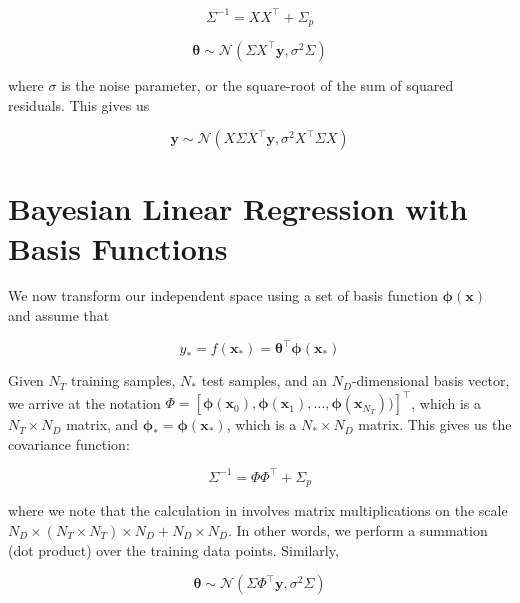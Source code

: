 \documentclass{article}
\begin{document}
\begin{equation}
    \Sigma^{-1} = X X^\top + \Sigma_p
\end{equation} 

\begin{equation}
    \boldsymbol{\theta}\sim\mathcal{N}(\Sigma X^\top \mathbf{y} ,\sigma^2\Sigma)
\end{equation} 

where $\sigma$ is the noise parameter, or the square-root of the sum of squared residuals. This gives us

\begin{equation}
    \mathbf{y}\sim\mathcal{N}(X \Sigma X^\top \mathbf{y} ,\sigma^2X^\top\Sigma X)
\end{equation} 


\section{Bayesian Linear Regression with Basis Functions}

We now transform our independent space using a set of basis function $\boldsymbol{\phi}(\mathbf{x})$ and assume that

\begin{equation}
    y_\ast=f(\mathbf{x_\ast})=\boldsymbol{\theta}^\top\boldsymbol{\phi}(\mathbf{x_\ast})
\end{equation} 

Given $N_T$ training samples, $N_\ast$ test samples, and an $N_D$-dimensional basis vector, we arrive at the notation $\Phi=[\boldsymbol{\phi}(\mathbf{x}_0),\boldsymbol{\phi}(\mathbf{x}_1),\dots,\boldsymbol{\phi}(\mathbf{x}_{N_T}))]^\top$, which is a $N_T \times N_D$ matrix, and  $\boldsymbol{\phi}_\ast=\boldsymbol{\phi}(\mathbf{x}_\ast)$, which is a $N_\ast \times N_D$ matrix. This gives us the covariance function:

\begin{equation}
    \Sigma^{-1} = \Phi \Phi^\top + \Sigma_p
\end{equation} 

where we note that the calculation in involves matrix multiplications on the scale $N_D \times (N_T \times N_T) \times N_D + N_D \times N_D$. In other words, we perform a summation (dot product) over the training data points.
Similarly,

\begin{equation}
    \boldsymbol{\theta}\sim\mathcal{N}(\Sigma \Phi^\top \mathbf{y} ,\sigma^2\Sigma)
\end{equation} 
\end{document}
